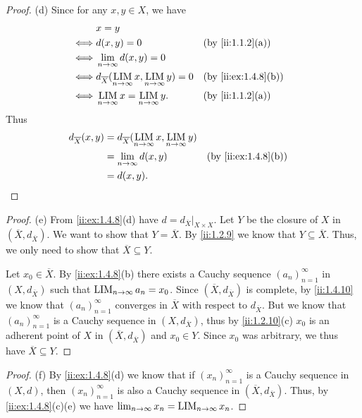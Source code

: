 \begin{proof}{(d)}
  Since for any \(x, y \in X\), we have
  \begin{align*}
         & x = y                                                                                       \\
    \iff & d(x, y) = 0                                                        &  & \by{ii:1.1.2}[a]    \\
    \iff & \lim_{n \to \infty} d(x, y) = 0                                                             \\
    \iff & d_{\overline{X}}(\LIM_{n \to \infty} x, \LIM_{n \to \infty} y) = 0 &  & \by{ii:ex:1.4.8}[b] \\
    \iff & \LIM_{n \to \infty} x = \LIM_{n \to \infty} y.                     &  & \by{ii:1.1.2}[a]
  \end{align*}
  Thus
  \begin{align*}
    d_{\overline{X}}(x, y) & = d_{\overline{X}}(\LIM_{n \to \infty} x, \LIM_{n \to \infty} y)                          \\
                           & = \lim_{n \to \infty} d(x, y)                                    &  & \by{ii:ex:1.4.8}[b] \\
                           & = d(x, y).
  \end{align*}
\end{proof}

\begin{proof}{(e)}
  From \cref{ii:ex:1.4.8}(d) have \(d = d_{\overline{X}}|_{X \times X}\).
  Let \(Y\) be the closure of \(X\) in \((\overline{X}, d_{\overline{X}})\).
  We want to show that \(Y = \overline{X}\).
  By \cref{ii:1.2.9} we know that \(Y \subseteq \overline{X}\).
  Thus, we only need to show that \(\overline{X} \subseteq Y\).

  Let \(x_0 \in \overline{X}\).
  By \cref{ii:ex:1.4.8}(b) there exists a Cauchy sequence \((a_n)_{n = 1}^\infty\) in \((X, d_{\overline{X}})\) such that \(\operatorname*{LIM}_{n \to \infty} a_n = x_0\).
  Since \((\overline{X}, d_{\overline{X}})\) is complete, by \cref{ii:1.4.10} we know that \((a_n)_{n = 1}^\infty\) converges in \(\overline{X}\) with respect to \(d_{\overline{X}}\).
  But we know that \((a_n)_{n = 1}^\infty\) is a Cauchy sequence in \((X, d_{\overline{X}})\), thus by \cref{ii:1.2.10}(c) \(x_0\) is an adherent point of \(X\) in \((\overline{X}, d_{\overline{X}})\) and \(x_0 \in Y\).
  Since \(x_0\) was arbitrary, we thus have \(\overline{X} \subseteq Y\).
\end{proof}

\begin{proof}{(f)}
  By \cref{ii:ex:1.4.8}(d) we know that if \((x_n)_{n = 1}^\infty\) is a Cauchy sequence in \((X, d)\), then \((x_n)_{n = 1}^\infty\) is also a Cauchy sequence in \((\overline{X}, d_{\overline{X}})\).
  Thus, by \cref{ii:ex:1.4.8}(c)(e) we have \(\lim_{n \to \infty} x_n = \operatorname*{LIM}_{n \to \infty} x_n\).
\end{proof}
